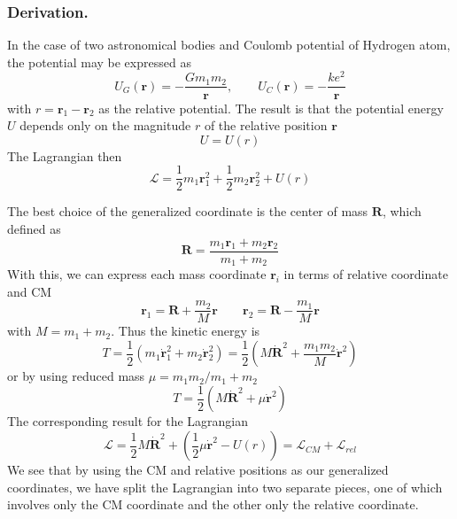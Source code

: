 \documentclass[../../../main.tex]{subfiles}
\begin{document}
\subsubsection{Derivation.}
In the case of two astronomical bodies and Coulomb potential of Hydrogen atom, the potential may be expressed as
\begin{equation*}
    U_G(\mathbf{r })=-\frac{Gm_1m_2}{\mathbf{r}},\qquad
    U_C(\mathbf{r})=-\frac{ke^2 }{\mathbf{r}}
\end{equation*}
with $r=\mathbf{r}_1-\mathbf{r}_2$ as the relative potential.
The result is that the potential energy $U$ depends only on the magnitude $r$ of the relative position $\mathbf{r}$
\begin{equation*}
    U=U(r)
\end{equation*}
The Lagrangian then
\begin{equation*}
    \mathcal{L }=\frac{1 }{2 }m_1 \mathbf{r }_1^2+\frac{1 }{2 }m_2 \mathbf{r }_2^2+U(r)
\end{equation*}

The best choice of the generalized coordinate is the center of mass $\mathbf{R}$, which defined as
\begin{equation*}
    \mathbf{R }=\frac{m_1 \mathbf{r}_1+m_2 \mathbf{r}_2}{m_1+m_2}
\end{equation*}
With this, we can express each mass coordinate $\mathbf{r}_i$ in terms of relative coordinate and CM
\begin{equation*}
    \mathbf{r}_1=\mathbf{R}+\frac{m_2}{M}\mathbf{r}
    \qquad
    \mathbf{r}_2=\mathbf{R}-\frac{m_1}{M}\mathbf{r}
\end{equation*}
with $M=m_1+m_2$.
Thus the kinetic energy is
\begin{equation*}
    T=\frac{1 }{2 }\left( m_1 \dot{\mathbf{r}}_1^2+m_2 \dot{\mathbf{r}}_2^2 \right) =\frac{1 }{2}\left( M \mathbf{\dot{R}}^2+\frac{m_1m_2}{M}\dot{\mathbf{r}}^2 \right)
\end{equation*}
or by using reduced mass $\mu=m_1m_2/m_1+m_2$
\begin{equation*}
    T=\frac{1 }{2}\left( M \mathbf{\dot{R}}^2+\mu\dot{\mathbf{r}}^2 \right)
\end{equation*}
The corresponding result for the Lagrangian
\begin{equation*}
    \mathcal{L}=\frac{1 }{2}M \dot{\mathbf{R}}^2+\left( \frac{1 }{2}\mu \dot{\mathbf{r}}^2-U(r) \right)=\mathcal{L}_{CM}+\mathcal{L}_{rel}
\end{equation*}
We see that by using the CM and relative positions as our generalized coordinates, we have split the Lagrangian into two separate pieces, one of which involves only the CM coordinate and the other only the relative coordinate.
\end{document}
